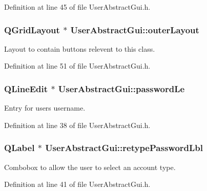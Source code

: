 Definition at line 45 of file User\-Abstract\-Gui.\-h.

\hypertarget{class_user_abstract_gui_a57a629bb0604b8eed762ec523f904f01}{
\subsubsection[{outer\-Layout}]{\setlength{\rightskip}{0pt plus 5cm}Q\-Grid\-Layout $\ast$ User\-Abstract\-Gui\-::outer\-Layout\hspace{0.3cm}{\ttfamily [private]}}}\label{class_user_abstract_gui_a57a629bb0604b8eed762ec523f904f01}
Layout to contain buttons relevent to this class. 

Definition at line 51 of file User\-Abstract\-Gui.\-h.

\hypertarget{class_user_abstract_gui_a142e171d275b18d682c7ba38097e7234}{
\subsubsection[{password\-Le}]{\setlength{\rightskip}{0pt plus 5cm}Q\-Line\-Edit $\ast$ User\-Abstract\-Gui\-::password\-Le\hspace{0.3cm}{\ttfamily [private]}}}\label{class_user_abstract_gui_a142e171d275b18d682c7ba38097e7234}
Entry for users username. 

Definition at line 38 of file User\-Abstract\-Gui.\-h.

\hypertarget{class_user_abstract_gui_a06db7b52e0c603b4aa91c644c8489944}{
\subsubsection[{retype\-Password\-Lbl}]{\setlength{\rightskip}{0pt plus 5cm}Q\-Label $\ast$ User\-Abstract\-Gui\-::retype\-Password\-Lbl\hspace{0.3cm}{\ttfamily [private]}}}\label{class_user_abstract_gui_a06db7b52e0c603b4aa91c644c8489944}
Combobox to allow the user to select an account type. 

Definition at line 41 of file User\-Abstract\-Gui.\-h.

